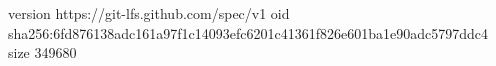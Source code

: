 version https://git-lfs.github.com/spec/v1
oid sha256:6fd876138adc161a97f1c14093efc6201c41361f826e601ba1e90adc5797ddc4
size 349680
